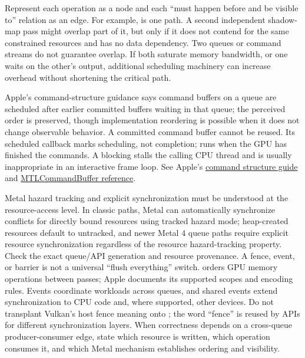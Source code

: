 Represent each operation as a node and each ``must happen before and be visible to'' relation as an edge. For example,  is one path. A second independent shadow-map pass might overlap part of it, but only if it does not contend for the same constrained resources and has no data dependency. Two queues or command streams do not guarantee overlap. If both saturate memory bandwidth, or one waits on the other's output, additional scheduling machinery can increase overhead without shortening the critical path.

Apple's command-structure guidance says command buffers on a queue are scheduled after earlier committed buffers waiting in that queue; the perceived order is preserved, though implementation reordering is possible when it does not change observable behavior. A committed command buffer cannot be reused. Its scheduled callback marks scheduling, not completion;  runs when the GPU has finished the commands. A blocking  stalls the calling CPU thread and is usually inappropriate in an interactive frame loop. See Apple's \href{https://developer.apple.com/documentation/Metal/setting-up-a-command-structure}{command structure guide} and \href{https://developer.apple.com/documentation/metal/mtlcommandbuffer}{MTLCommandBuffer reference}.

Metal hazard tracking and explicit synchronization must be understood at the resource-access level. In classic  paths, Metal can automatically synchronize conflicts for directly bound resources using tracked hazard mode; heap-created resources default to untracked, and newer Metal 4 queue paths require explicit resource synchronization regardless of the resource hazard-tracking property. Check the exact queue/API generation and resource provenance. A fence, event, or barrier is not a universal ``flush everything'' switch.  orders GPU memory operations between passes; Apple documents its supported scopes and encoding rules. Events coordinate workloads across queues, and shared events extend synchronization to CPU code and, where supported, other devices. Do not transplant Vulkan's host fence meaning onto ; the word ``fence'' is reused by APIs for different synchronization layers. When correctness depends on a cross-queue producer-consumer edge, state which resource is written, which operation consumes it, and which Metal mechanism establishes ordering and visibility.

